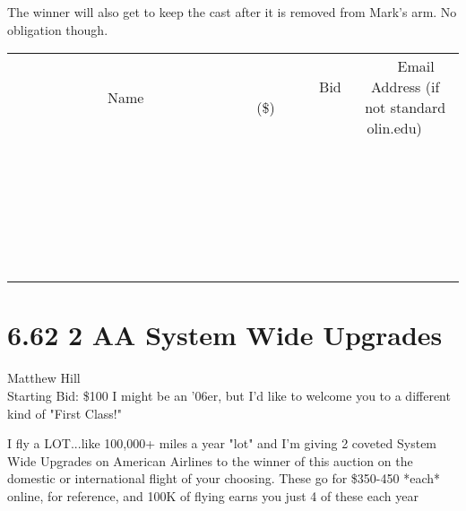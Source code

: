 \documentclass[11pt]{article}
\begin{document}
The winner will also get to keep the cast after it is removed from Mark's arm. No obligation though.
\\[6ex]
\begin{tabular}{c c c}
~~~~~~~~~~~~~Name~~~~~~~~~~~~~ & ~~~~~~~~~Bid (\$)~~~~~~~~~  & ~~~Email Address (if not standard olin.edu)~~~\\
 & & \\
\hline
 & & \\
\hline
 & & \\
\hline
 & & \\
\hline
 & & \\
\hline
 & & \\
\hline
 & & \\
\hline
 & & \\
\hline
 & & \\
\hline
 & & \\
\hline
 & & \\
\hline
 & & \\
\hline
 & & \\
\hline
 & & \\
\hline
 & & \\
\hline
 & & \\
\hline
 & & \\
\hline
 & & \\
\hline
 & & \\
\hline
 & & \\
\hline
 & & \\
\hline
 & & \\
\hline
 & & \\
\hline
 & & \\
\hline
 & & \\
\hline
 & & \\
\hline
\end{tabular}
\newpage
\section*{6.62 2 AA System Wide Upgrades}
Matthew Hill
\\
Starting Bid: \$100
\newline
I might be an '06er, but I'd like to welcome you to a different kind of "First Class!"

I fly a LOT...like 100,000+ miles a year "lot" and I'm giving 2 coveted System Wide Upgrades on American Airlines to the winner of this auction on the domestic or international flight of your choosing. These go for \$350-450 *each* online, for reference, and 100K of flying earns you just 4 of these each year
\end{document}

